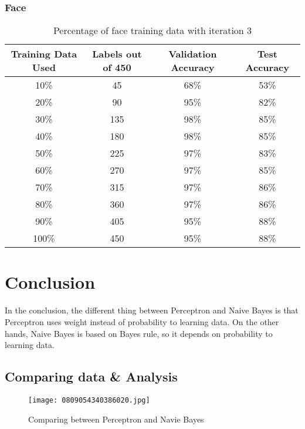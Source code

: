 \documentclass{article}
\begin{document}
        \subsubsection{Face}
            \begin{table}[h]
                \centering
                \begin{tabular}{c|c|c|c}
                    \hline
                        Training Data Used & Labels out of 450 & Validation Accuracy & Test Accuracy \\
                    \hline
                        10\% & 45 & 68\% & 53\%\\
                    \hline
                        20\% & 90 & 95\% & 82\%\\
                    \hline
                        30\% & 135 & 98\% & 85\%\\
                    \hline
                        40\% & 180 & 98\% & 85\%\\
                    \hline
                        50\% & 225 & 97\% & 83\%\\
                    \hline
                        60\% & 270 & 97\% & 85\%\\
                    \hline
                        70\% & 315 & 97\% & 86\%\\
                    \hline
                        80\% & 360 & 97\% & 86\%\\
                    \hline
                        90\% & 405 & 95\% & 88\%\\
                    \hline
                        100\% & 450 & 95\% & 88\%\\
                    \hline
                \end{tabular}
                \caption{Percentage of face training data with iteration 3}
            \end{table}
\section{Conclusion}
\hspace*{10mm}In the conclusion, the different thing between Perceptron and Naive Bayes is that Perceptron uses weight instead of probability to learning data. On the other hands, Naive Bayes is based on Bayes rule, so it depends on probability to learning data.\\
    \newpage
    \subsection{Comparing data \& Analysis }
\begin{figure}[h]
    \centering
    \texttt{[image: 0809054340386020.jpg]}
    \caption{Comparing between Perceptron and Navie Bayes}
\end{figure}
\end{document}
